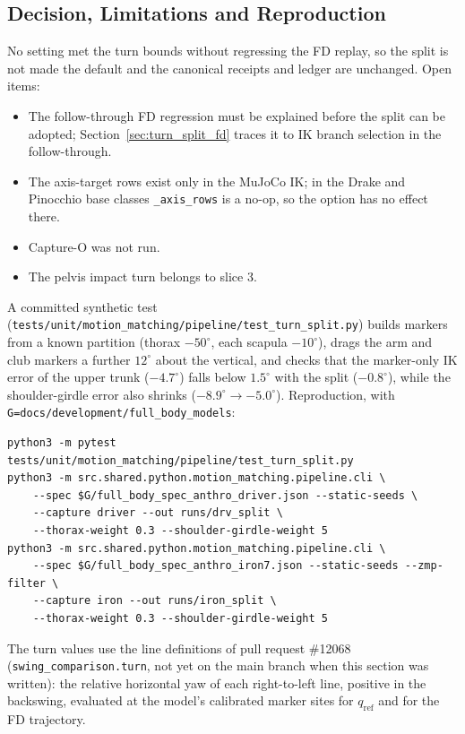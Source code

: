 \documentclass[11pt,a4paper]{article}
\begin{document}
\subsection{Decision, Limitations and Reproduction}
No setting met the turn bounds without regressing the FD replay, so the split is not made the default and the canonical receipts and ledger are unchanged. Open items:
\begin{itemize}
\item The follow-through FD regression must be explained before the split can be adopted; Section~\ref{sec:turn_split_fd} traces it to IK branch selection in the follow-through.
\item The axis-target rows exist only in the MuJoCo IK; in the Drake and Pinocchio base classes \texttt{\_axis\_rows} is a no-op, so the option has no effect there.
\item Capture-O was not run.
\item The pelvis impact turn belongs to slice 3.
\end{itemize}
A committed synthetic test (\texttt{tests/unit/motion\_matching/pipeline/test\_turn\_split.py}) builds markers from a known partition (thorax $-50^\circ$, each scapula $-10^\circ$), drags the arm and club markers a further $12^\circ$ about the vertical, and checks that the marker-only IK error of the upper trunk ($-4.7^\circ$) falls below $1.5^\circ$ with the split ($-0.8^\circ$), while the shoulder-girdle error also shrinks ($-8.9^\circ\to-5.0^\circ$). Reproduction, with \texttt{G=docs/development/full\_body\_models}:
\begin{verbatim}
python3 -m pytest tests/unit/motion_matching/pipeline/test_turn_split.py
python3 -m src.shared.python.motion_matching.pipeline.cli \
    --spec $G/full_body_spec_anthro_driver.json --static-seeds \
    --capture driver --out runs/drv_split \
    --thorax-weight 0.3 --shoulder-girdle-weight 5
python3 -m src.shared.python.motion_matching.pipeline.cli \
    --spec $G/full_body_spec_anthro_iron7.json --static-seeds --zmp-filter \
    --capture iron --out runs/iron_split \
    --thorax-weight 0.3 --shoulder-girdle-weight 5
\end{verbatim}
The turn values use the line definitions of pull request \#12068 (\texttt{swing\_comparison.turn}, not yet on the main branch when this section was written): the relative horizontal yaw of each right-to-left line, positive in the backswing, evaluated at the model's calibrated marker sites for $q_{\mathrm{ref}}$ and for the FD trajectory.
\end{document}
